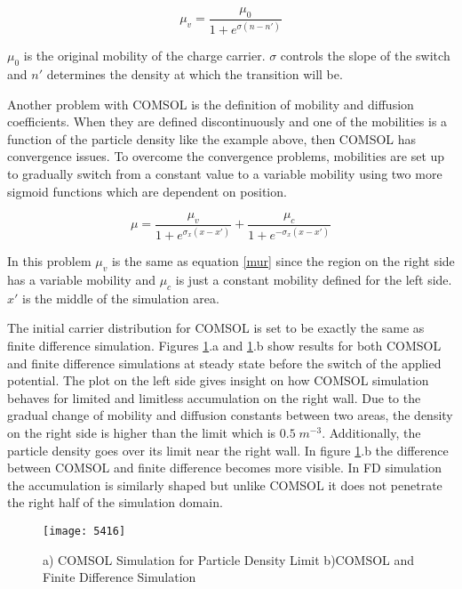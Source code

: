 \begin{doublespace}
\begin{equation}
\mu_v = \frac{\mu_{0}}{1+e^{\sigma(n-n')}}
\label{mur}
\end{equation} 

$\mu_0$ is the original mobility of the charge carrier. $\sigma$ controls the slope of the switch and $n'$ determines the density at which the transition will be. 

Another problem with COMSOL is the definition of mobility and diffusion coefficients. When they are defined discontinuously and one of the mobilities is a function of the particle density like the example above, then COMSOL has convergence issues. To overcome the convergence problems, mobilities are set up to gradually switch from a constant value to a variable mobility using two more sigmoid functions which are dependent on position.

\begin{equation}
\mu=\frac{\mu_{v}}{1+e^{\sigma_x(x-x')}}+\frac{\mu_{c}}{1+e^{-\sigma_x(x-x')}}
\end{equation}

In this problem $\mu_v$ is the same as equation \ref{mur} since the region on the right side has a variable mobility and $\mu_c$ is just a constant mobility defined for the left side. $x'$ is the middle of the simulation area.

The initial carrier distribution for COMSOL is set to be exactly the same as finite difference simulation. Figures \ref{5416}.a and \ref{5416}.b show results for both COMSOL and finite difference simulations at steady state before the switch of the applied potential. The plot on the left side gives insight on how COMSOL simulation behaves for limited and limitless accumulation on the right wall. Due to the gradual change of mobility and diffusion constants between two areas, the density on the right side is higher than the limit which is $0.5 \; m^{-3}$. Additionally, the particle density goes over its limit near the right wall. In figure \ref{5416}.b the difference between COMSOL and finite difference becomes more visible. In FD simulation the accumulation is similarly shaped but unlike COMSOL it does not penetrate the right half of the simulation domain. 

\begin{figure}[!htp]
\centering
\texttt{[image: 5416]}
\caption{ a) COMSOL Simulation for Particle Density Limit b)COMSOL and Finite Difference Simulation} 
\label{5416}
\end{figure}



\end{doublespace}
